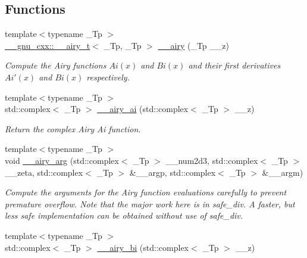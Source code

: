 \subsection*{Functions}
\begin{DoxyCompactItemize}
\item 
{\footnotesize template$<$typename \+\_\+\+Tp $>$ }\\\hyperlink{struct____gnu__cxx_1_1____airy__t}{\+\_\+\+\_\+gnu\+\_\+cxx\+::\+\_\+\+\_\+airy\+\_\+t}$<$ \+\_\+\+Tp, \+\_\+\+Tp $>$ \hyperlink{namespacestd_1_1____detail_ab88aba2ff9e70425c477043a9fa6a0dc}{\+\_\+\+\_\+airy} (\+\_\+\+Tp \+\_\+\+\_\+z)
\begin{DoxyCompactList}\small\item\em Compute the Airy functions $ Ai(x) $ and $ Bi(x) $ and their first derivatives $ Ai'(x) $ and $ Bi(x) $ respectively. \end{DoxyCompactList}\item 
{\footnotesize template$<$typename \+\_\+\+Tp $>$ }\\std\+::complex$<$ \+\_\+\+Tp $>$ \hyperlink{namespacestd_1_1____detail_afd48b5702344f832a250922ac4ffb917}{\+\_\+\+\_\+airy\+\_\+ai} (std\+::complex$<$ \+\_\+\+Tp $>$ \+\_\+\+\_\+z)
\begin{DoxyCompactList}\small\item\em Return the complex Airy Ai function. \end{DoxyCompactList}\item 
{\footnotesize template$<$typename \+\_\+\+Tp $>$ }\\void \hyperlink{namespacestd_1_1____detail_a2473fe60310e9480137e3b66d3944f15}{\+\_\+\+\_\+airy\+\_\+arg} (std\+::complex$<$ \+\_\+\+Tp $>$ \+\_\+\+\_\+num2d3, std\+::complex$<$ \+\_\+\+Tp $>$ \+\_\+\+\_\+zeta, std\+::complex$<$ \+\_\+\+Tp $>$ \&\+\_\+\+\_\+argp, std\+::complex$<$ \+\_\+\+Tp $>$ \&\+\_\+\+\_\+argm)
\begin{DoxyCompactList}\small\item\em Compute the arguments for the Airy function evaluations carefully to prevent premature overflow. Note that the major work here is in {\ttfamily safe\+\_\+div}. A faster, but less safe implementation can be obtained without use of safe\+\_\+div. \end{DoxyCompactList}\item 
{\footnotesize template$<$typename \+\_\+\+Tp $>$ }\\std\+::complex$<$ \+\_\+\+Tp $>$ \hyperlink{namespacestd_1_1____detail_ae5536305d721e393efe1a74f0e57653e}{\+\_\+\+\_\+airy\+\_\+bi} (std\+::complex$<$ \+\_\+\+Tp $>$ \+\_\+\+\_\+z)

\end{DoxyCompactItemize}
